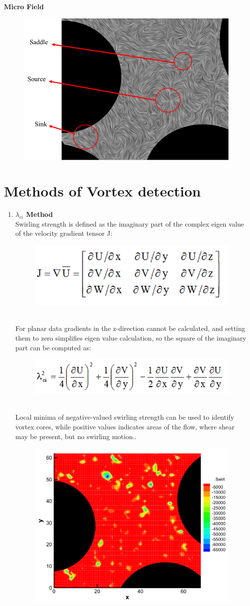 \documentclass[letterpaper,12pt,titlepage,fleqn]{article}
\begin{document}
\begin{CJK}{UTF8}{gkai}
\textbf{Micro Field}
\begin{figure}[!h]
	\centering
	\includegraphics[width= 0.5\linewidth ]{pic7.png}
\end{figure}

\section{Methods of Vortex detection}
\begin{enumerate}
\item \textbf{$\lambda_{ci}$ Method}\\
Swirling strength is defined as the imaginary part of the complex eigen value of the velocity gradient tensor J:
\begin{figure}[!h]
	\centering
	\includegraphics[width= 0.5\linewidth ]{pic8.png}
\end{figure}
\\For planar data gradients in the z-direction cannot be calculated, and setting them to zero simplifies eigen value calculation, so the square of the imaginary part can be computed as:
\begin{figure}[!h]
	\centering
	\includegraphics[width= 0.5\linewidth ]{pic9.png}
\end{figure}
\\Local minima of negative-valued swirling strength can be used to identify vortex cores, while positive values indicates areas of the flow, where shear may be present, but no swirling motion..
\begin{figure}[!h]
	\centering
	\includegraphics[width= 0.5\linewidth ]{pic10.png}
\end{figure}


\end{enumerate}
\end{CJK}
\end{document}
